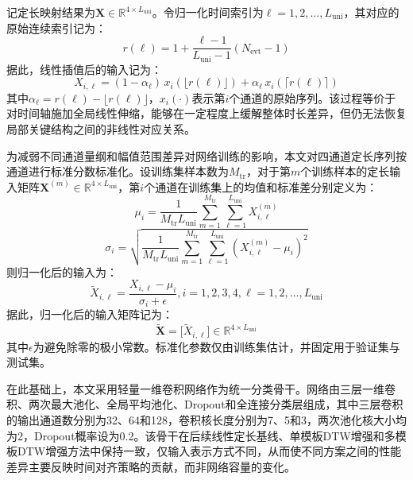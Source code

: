 \documentclass{xdupgthesis}
\begin{document}
记定长映射结果为$\mathbf{X}\in\mathbb{R}^{4\times L_{\mathrm{uni}}}$。令归一化时间索引为$\ell=1,2,\ldots,L_{\mathrm{uni}}$，其对应的原始连续索引记为：
\begin{equation}
    r(\ell)=1+\frac{\ell-1}{L_{\mathrm{uni}}-1}(N_{\mathrm{evt}}-1)
\end{equation}
据此，线性插值后的输入记为：
\begin{equation}
    X_{i,\ell}=(1-\alpha_\ell)\,x_i(\lfloor r(\ell)\rfloor)+\alpha_\ell\,x_i(\lceil r(\ell)\rceil)
\end{equation}
其中$\alpha_\ell=r(\ell)-\lfloor r(\ell)\rfloor$，$x_i(\cdot)$表示第$i$个通道的原始序列。该过程等价于对时间轴施加全局线性伸缩，能够在一定程度上缓解整体时长差异，但仍无法恢复局部关键结构之间的非线性对应关系。

为减弱不同通道量纲和幅值范围差异对网络训练的影响，本文对四通道定长序列按通道进行标准分数标准化。设训练集样本数为$M_{\mathrm{tr}}$，对于第$m$个训练样本的定长输入矩阵$\mathbf{X}^{(m)}\in\mathbb{R}^{4\times L_{\mathrm{uni}}}$，第$i$个通道在训练集上的均值和标准差分别定义为：
\begin{equation}
    \mu_i=\frac{1}{M_{\mathrm{tr}}L_{\mathrm{uni}}}
    \sum_{m=1}^{M_{\mathrm{tr}}}\sum_{\ell=1}^{L_{\mathrm{uni}}}X_{i,\ell}^{(m)}
\end{equation}
\begin{equation}
    \sigma_i=
    \sqrt{
    \frac{1}{M_{\mathrm{tr}}L_{\mathrm{uni}}}
    \sum_{m=1}^{M_{\mathrm{tr}}}\sum_{\ell=1}^{L_{\mathrm{uni}}}
    \left(X_{i,\ell}^{(m)}-\mu_i\right)^2}
\end{equation}
则归一化后的输入为：
\begin{equation}
    \tilde{X}_{i,\ell}=\frac{X_{i,\ell}-\mu_i}{\sigma_i+\epsilon}, i=1,2,3,4, \ell=1,2,\ldots,L_{\mathrm{uni}}
\end{equation}
据此，归一化后的输入矩阵记为：
\begin{equation}
    \tilde{\mathbf{X}}=\big[\tilde{X}_{i,\ell}\big]\in\mathbb{R}^{4\times L_{\mathrm{uni}}}
\end{equation}
其中$\epsilon$为避免除零的极小常数。标准化参数仅由训练集估计，并固定用于验证集与测试集。

在此基础上，本文采用轻量一维卷积网络作为统一分类骨干。网络由三层一维卷积、两次最大池化、全局平均池化、Dropout和全连接分类层组成，其中三层卷积的输出通道数分别为32、64和128，卷积核长度分别为7、5和3，两次池化核大小均为2，Dropout概率设为0.2。该骨干在后续线性定长基线、单模板DTW增强和多模板DTW增强方法中保持一致，仅输入表示方式不同，从而使不同方案之间的性能差异主要反映时间对齐策略的贡献，而非网络容量的变化。
\end{document}
